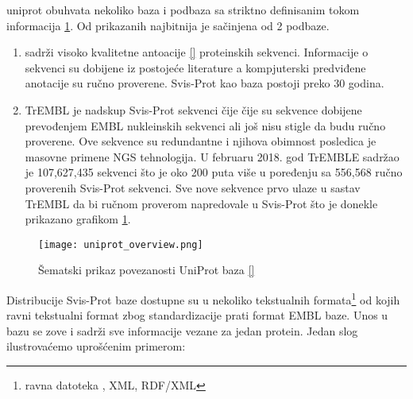 uniprot obuhvata nekoliko baza i podbaza sa striktno definisanim tokom
informacija \ref{fig:uniprot_overview}. Od prikazanih najbitnija je
  sačinjena od 2 podbaze.


\begin{enumerate}
  \item {}  sadrži visoko kvalitetne antoacije
    \ref{} proteinskih sekvenci. Informacije o sekvenci su
    dobijene iz postojeće literature a kompjuterski predviđene anotacije su
    ručno proverene. Svis-Prot kao baza postoji preko 30 godina.

  \item TrEMBL  je nadskup Svis-Prot sekvenci čije čije su
    sekvence dobijene prevođenjem EMBL nukleinskih sekvenci ali još nisu stigle
    da budu ručno  proverene. Ove sekvence su redundantne i njihova obimnost
    posledica je masovne primene NGS tehnologija. U februaru 2018. god TrEMBLE
    sadržao je 107,627,435 sekvenci što je oko 200 puta više u poređenju sa
    556,568 ručno proverenih Svis-Prot sekvenci. Sve nove sekvence prvo ulaze u
    sastav TrEMBL da bi ručnom proverom napredovale u Svis-Prot što je donekle
    prikazano grafikom \ref{fig:uniprot_overview}.
\end{enumerate}


\begin{figure}[h!]
  \centering
  \texttt{[image: uniprot\_overview.png]}
  \caption{Šematski prikaz povezanosti UniProt baza \ref{}}
  \label{fig:uniprot_overview}
\end{figure}

%


Distribucije Svis-Prot baze dostupne su u nekoliko tekstualnih
formata\footnote{ravna datoteka , XML, RDF/XML} od kojih
ravni tekstualni format zbog standardizacije prati format EMBL baze.
Unos u bazu se zove   i sadrži sve informacije vezane
za jedan protein. Jedan slog ilustrovaćemo uprošćenim primerom:

